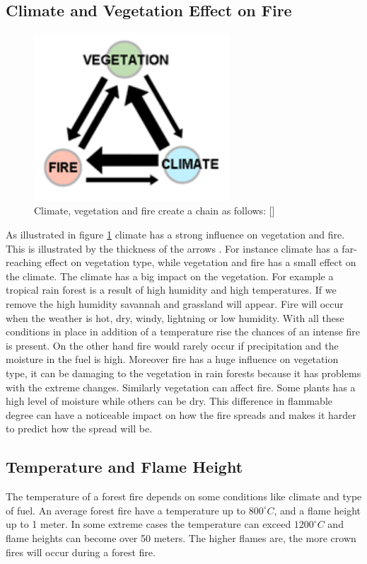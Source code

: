\subsection{Climate and Vegetation Effect on Fire}
\begin{figure}[here]
  \centering
      \includegraphics[width=0.65\textwidth]{theory/graphics/fire-climate.png}
  \caption{Climate, vegetation and fire create a chain as follows: [] }
  \label{fig:fire-climate}
\end{figure}
As illustrated in figure \ref{fig:fire-climate} climate has a strong influence on vegetation and fire. This is illustrated by the thickness of the arrows . For instance climate has a far-reaching effect on vegetation type, while vegetation and fire has a small effect on the climate. The climate has a big impact on the vegetation. For example a tropical rain forest is a result of high humidity and high temperatures. If we remove the high humidity savannah and grassland will appear. Fire will occur when the weather is hot, dry, windy, lightning or low humidity. With all these conditions in place in addition of a temperature rise the chances of an intense fire is present. On the other hand fire would rarely occur if precipitation and the moisture in the fuel is high.  Moreover fire has a huge influence on vegetation type, it can be damaging to the vegetation in rain forests because it has problems with the extreme changes. Similarly vegetation can affect fire. Some plants has a high level of moisture while others can be dry. This difference in flammable degree can have a noticeable impact on how the fire spreads and makes it harder to predict how the spread will be.
\subsection{Temperature and Flame Height}
The temperature of a forest fire depends on some conditions like climate and type of fuel. An average forest fire have a temperature up to $800^{\circ}C$, and a flame height up to 1 meter. In some extreme cases the temperature can exceed $1200^{\circ}C$ and flame heights can become over 50 meters. The higher flames are, the more crown fires will occur during a forest fire.
